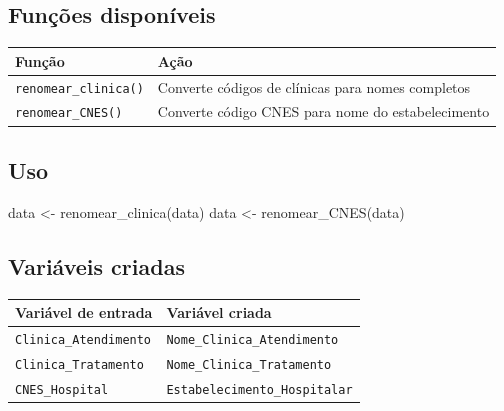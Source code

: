 \documentclass[
  brazilian,
  a4paper,
  oneside]{scrbook}
\newenvironment{Shaded}{\begin{snugshade}}{\end{snugshade}}
\newcommand{\FunctionTok}[1]{\textcolor[rgb]{0.28,0.35,0.67}{#1}}
\newcommand{\NormalTok}[1]{\textcolor[rgb]{0.00,0.23,0.31}{#1}}
\newcommand{\OtherTok}[1]{\textcolor[rgb]{0.00,0.23,0.31}{#1}}
\newcounter{none} %
\begin{document}
\subsection{Funções disponíveis}\label{funuxe7uxf5es-disponuxedveis-1}

{\def\LTcaptype{none} %
\begin{longtable}[]{@{}
  >{\raggedright\arraybackslash}p{}
  >{\raggedright\arraybackslash}p{}@{}}
\toprule\noalign{}
\begin{minipage}[b]{\linewidth}\raggedright
Função
\end{minipage} & \begin{minipage}[b]{\linewidth}\raggedright
Ação
\end{minipage} \\
\midrule\noalign{}
\endhead
\bottomrule\noalign{}
\endlastfoot
\texttt{renomear\_clinica()} & Converte códigos de clínicas para nomes
completos \\
\texttt{renomear\_CNES()} & Converte código CNES para nome do
estabelecimento \\
\end{longtable}
}

\subsection{Uso}\label{uso-6}

\begin{Shaded}
\begin{Highlighting}[]
\NormalTok{data }\OtherTok{\textless{}{-}} \FunctionTok{renomear\_clinica}\NormalTok{(data)}
\NormalTok{data }\OtherTok{\textless{}{-}} \FunctionTok{renomear\_CNES}\NormalTok{(data)}
\end{Highlighting}
\end{Shaded}

\subsection{Variáveis criadas}\label{variuxe1veis-criadas-1}

{\def\LTcaptype{none} %
\begin{longtable}[]{@{}ll@{}}
\toprule\noalign{}
Variável de entrada & Variável criada \\
\midrule\noalign{}
\endhead
\bottomrule\noalign{}
\endlastfoot
\texttt{Clinica\_Atendimento} & \texttt{Nome\_Clinica\_Atendimento} \\
\texttt{Clinica\_Tratamento} & \texttt{Nome\_Clinica\_Tratamento} \\
\texttt{CNES\_Hospital} & \texttt{Estabelecimento\_Hospitalar} \\
\end{longtable}
}
\end{document}
